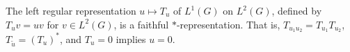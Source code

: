 \begin{theorem}
The left regular representation $u \mapsto T_u$ of $L^1(G)$ on $L^2(G)$, defined by $T_u v = uv$ for $v \in L^2(G)$, is a faithful $*$-representation. That is, $T_{u_1 u_2} = T_{u_1} T_{u_2}$, $T_{\tilde{u}} = (T_u)^*$, and $T_u = 0$ implies $u = 0$.
\end{theorem}
